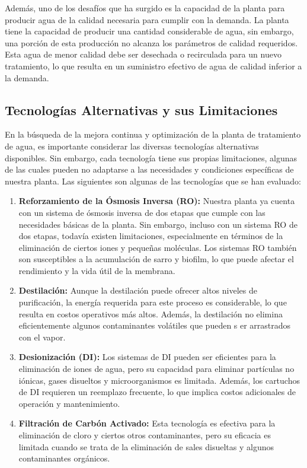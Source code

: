 Además, uno de los desafíos que ha surgido es la capacidad de la 
planta para producir agua de la calidad necesaria para cumplir con la demanda. 
La planta tiene la capacidad de producir una cantidad considerable de agua, 
sin embargo, una porción de esta producción no alcanza los parámetros de 
calidad requeridos. Esta agua de menor calidad debe ser desechada o 
recirculada para un nuevo tratamiento, lo que resulta en un suministro 
efectivo de agua de calidad inferior a la demanda.\\

\subsection{Tecnologías Alternativas y sus Limitaciones}

En la búsqueda de la mejora continua y optimización de la planta de tratamiento de agua, 
es importante considerar las diversas tecnologías alternativas disponibles. 
Sin embargo, cada tecnología tiene sus propias limitaciones, algunas de las 
cuales pueden no adaptarse a las necesidades y condiciones específicas de nuestra planta. 
Las siguientes son algunas de las tecnologías que se han evaluado:

\begin{enumerate}
    \item \textbf{Reforzamiento de la Ósmosis Inversa (RO):}  Nuestra planta ya cuenta con 
    un sistema de ósmosis inversa de dos etapas que cumple con las necesidades 
    básicas de la planta. Sin embargo, incluso con un sistema RO de dos etapas, 
    todavía existen limitaciones, especialmente en términos de la eliminación de 
    ciertos iones y pequeñas moléculas. Los sistemas RO también son susceptibles a 
    la acumulación de sarro y biofilm, lo que puede afectar el rendimiento y 
    la vida útil de la membrana.
    
    \item \textbf{Destilación:}  Aunque la destilación puede ofrecer altos niveles de 
    purificación, la energía requerida para este proceso es considerable, 
    lo que resulta en costos operativos más altos. Además, la destilación 
    no elimina eficientemente algunos contaminantes volátiles que pueden s
    er arrastrados con el vapor.

    \item \textbf{Desionización (DI): } Los sistemas de DI pueden ser eficientes para 
    la eliminación de iones de agua, pero su capacidad para eliminar 
    partículas no iónicas, gases disueltos y microorganismos es limitada. 
    Además, los cartuchos de DI requieren un reemplazo frecuente, lo que 
    implica costos adicionales de operación y mantenimiento.

    \item \textbf{Filtración de Carbón Activado:}  Esta tecnología es efectiva para la 
    eliminación de cloro y ciertos otros contaminantes, pero su eficacia es 
    limitada cuando se trata de la eliminación de sales disueltas y 
    algunos contaminantes orgánicos.

\end{enumerate}


